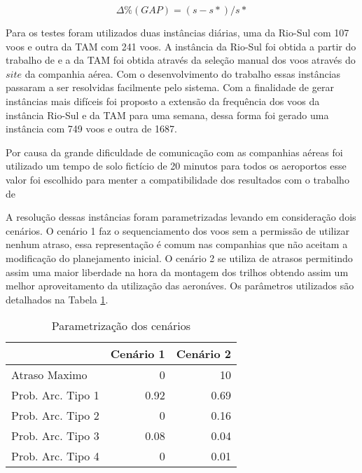 \[  \Delta \% (GAP) = (s - s*)/s* \]

Para os testes foram utilizados duas instâncias diárias, uma da Rio-Sul com 107
voos e outra da TAM com 241 voos. A instância da Rio-Sul foi obtida a partir do
trabalho de \cite{pontes2002} e a da TAM foi obtida através da seleção manual
dos voos através do $site$ da companhia aérea. Com o desenvolvimento do trabalho
essas instâncias passaram a ser resolvidas facilmente pelo sistema. Com a
finalidade de gerar instâncias mais difíceis foi proposto a extensão da
frequência dos voos da instância Rio-Sul e da TAM para uma semana, dessa forma
foi gerado uma instância com 749 voos e outra de 1687. 

Por causa da grande dificuldade de comunicação com as companhias aéreas foi
utilizado um tempo de solo fictício de 20 minutos para todos os aeroportos esse
valor foi escolhido para menter a compatibilidade dos resultados com o trabalho
de \cite{pontes2002}

A resolução dessas instâncias foram parametrizadas levando em consideração dois
cenários. O cenário 1 faz o sequenciamento dos voos sem a permissão de utilizar
nenhum atraso, essa representação é comum nas companhias que não aceitam a
modificação do planejamento inicial. O cenário 2 se utiliza de atrasos
permitindo assim uma maior liberdade na hora da montagem dos trilhos obtendo
assim um melhor aproveitamento da utilização das aeronáves. Os parâmetros
utilizados são detalhados na Tabela \ref{tab:params}.


\begin{table}
\caption{Parametrização dos cenários}\label{tab:params}
\begin{center}


\begin{tabular}{l|rr}
\hline

 & Cenário 1 & Cenário 2 \\
 \hline
 Atraso Maximo & 0 & 10 \\
 Prob. Arc. Tipo 1 & 0.92 & 0.69\\ 
 Prob. Arc. Tipo 2 & 0 & 0.16\\
 Prob. Arc. Tipo 3 & 0.08 & 0.04 \\
 Prob. Arc. Tipo 4 & 0 & 0.01 \\
  
\hline

\end{tabular}
\end{center}
\end{table}




